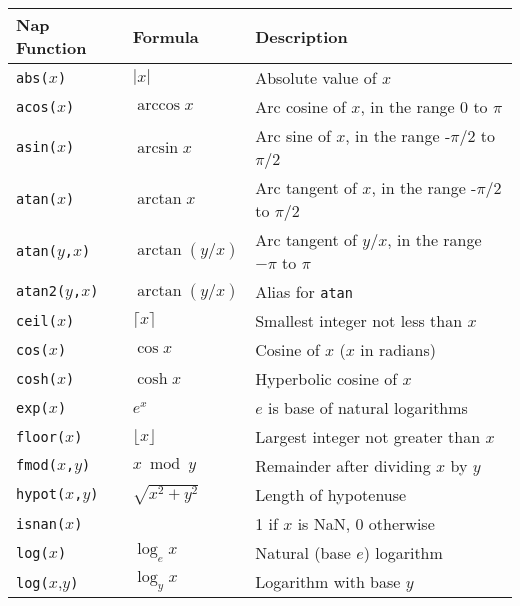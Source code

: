 \begin{tabular}{|l|l|l|}
    \hline 
      \textbf{Nap Function} & \textbf{Formula} & \textbf{Description}
    \\
      \hline 
      \hline 
        \texttt{abs(}$x$\texttt{)} & $|x|$ & Absolute value of $x$
      \\
      \hline 
        \texttt{acos(}$x$\texttt{)} & $\arccos x$ & Arc cosine of $x$, in the range 0 to $\pi$
      \\
      \hline 
        \texttt{asin(}$x$\texttt{)} & $\arcsin x$ & Arc sine of $x$, in the range -$\pi$/2 to $\pi$/2
      \\
      \hline 
        \texttt{atan(}$x$\texttt{)} & $\arctan x$ & Arc tangent of $x$, in the range -$\pi$/2 to $\pi$/2
      \\
      \hline 
    \texttt{atan(}$y$\texttt{,}$x$\texttt{)} & $\arctan(y/x)$ & Arc tangent of $y/x$, in the range $-\pi$ to $\pi$
      \\
      \hline 
        \texttt{atan2(}$y$\texttt{,}$x$\texttt{)} & $\arctan(y/x)$ & Alias for \texttt{atan}
      \\
      \hline 
        \texttt{ceil(}$x$\texttt{)} & $\lceil x\rceil$ & Smallest integer not less than $x$
      \\
      \hline 
        \texttt{cos(}$x$\texttt{)} & $\cos x$ & Cosine of $x$ ($x$ in radians)
      \\
      \hline 
        \texttt{cosh(}$x$\texttt{)} & $\cosh x$ & Hyperbolic cosine of $x$
      \\
      \hline 
        \texttt{exp(}$x$\texttt{)} & $e^x$ & $e$ is base of natural logarithms
      \\
      \hline 
        \texttt{floor(}$x$\texttt{)} & $\lfloor x\rfloor$ & Largest integer not greater than $x$
      \\
      \hline 
        \texttt{fmod(}$x$\texttt{,}$y$\texttt{)} & $x \bmod y$ & Remainder after dividing $x$ by $y$
      \\
      \hline 
        \texttt{hypot(}$x$\texttt{,}$y$\texttt{)} & $\sqrt{x^2+y^2}$ & Length of hypotenuse
      \\
      \hline 
        \texttt{isnan(}$x$\texttt{)} & & 1 if $x$ is NaN, 0 otherwise
      \\
      \hline 
        \texttt{log(}$x$\texttt{)} & $\log_e x$ & Natural (base $e$) logarithm
      \\
      \hline 
        \texttt{log(}$x$,$y$\texttt{)} & $\log_y x$ & Logarithm with base $y$
      \\

\end{tabular}
